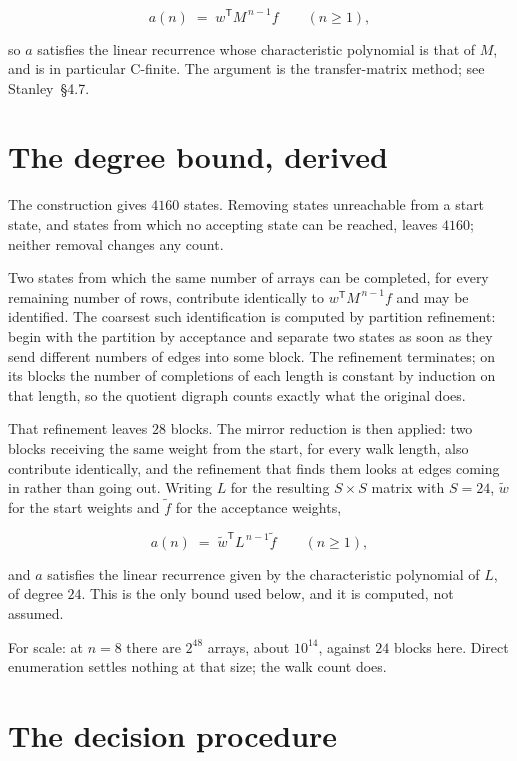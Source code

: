 \documentclass[11pt]{article}
\theoremstyle{definition}
\begin{document}
\[a(n) \;=\; w^{\mathsf T} M^{\,n-1} f \qquad (n \ge 1),\]

so $a$ satisfies the linear recurrence whose characteristic polynomial is that of $M$, and is in particular C-finite. The argument is the transfer-matrix method; see Stanley~\S4.7.

\section{The degree bound, derived}

The construction gives $4160$ states. Removing states unreachable from a start state, and states from which no accepting state can be reached, leaves $4160$; neither removal changes any count.

Two states from which the same number of arrays can be completed, for every remaining number of rows, contribute identically to $w^{\mathsf T}M^{\,n-1}f$ and may be identified. The coarsest such identification is computed by partition refinement: begin with the partition by acceptance and separate two states as soon as they send different numbers of edges into some block. The refinement terminates; on its blocks the number of completions of each length is constant by induction on that length, so the quotient digraph counts exactly what the original does.

That refinement leaves $28$ blocks. The mirror reduction is then applied: two blocks receiving the same weight from the start, for every walk length, also contribute identically, and the refinement that finds them looks at edges coming in rather than going out. Writing $L$ for the resulting $S \times S$ matrix with $S = 24$, $\tilde w$ for the start weights and $\tilde f$ for the acceptance weights,

\[a(n) \;=\; \tilde w^{\mathsf T} L^{\,n-1} \tilde f \qquad (n \ge 1),\]

and $a$ satisfies the linear recurrence given by the characteristic polynomial of $L$, of degree $24$. This is the only bound used below, and it is computed, not assumed.

For scale: at $n = 8$ there are $2^{48}$ arrays, about $10^{14}$, against $24$ blocks here. Direct enumeration settles nothing at that size; the walk count does.

\section{The decision procedure}
\end{document}

